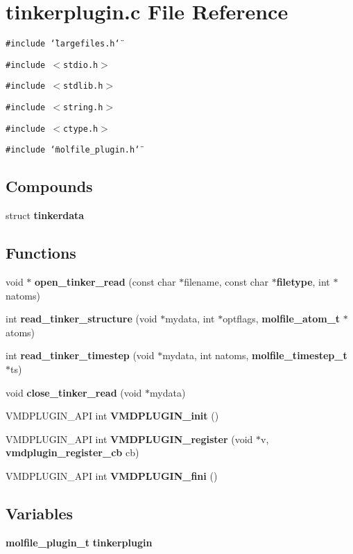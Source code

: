 \section{tinkerplugin.c File Reference}
\label{tinkerplugin_8c}
{\tt \#include \char`\"{}largefiles.h\char`\"{}}\par
{\tt \#include $<$stdio.h$>$}\par
{\tt \#include $<$stdlib.h$>$}\par
{\tt \#include $<$string.h$>$}\par
{\tt \#include $<$ctype.h$>$}\par
{\tt \#include \char`\"{}molfile\_\-plugin.h\char`\"{}}\par
\subsection*{Compounds}
\begin{CompactItemize}
\item 
struct {\bf tinkerdata}
\end{CompactItemize}
\subsection*{Functions}
\begin{CompactItemize}
\item 
void $\ast$ {\bf open\_\-tinker\_\-read} (const char $\ast$filename, const char $\ast${\bf filetype}, int $\ast$natoms)
\item 
int {\bf read\_\-tinker\_\-structure} (void $\ast$mydata, int $\ast$optflags, {\bf molfile\_\-atom\_\-t} $\ast$atoms)
\item 
int {\bf read\_\-tinker\_\-timestep} (void $\ast$mydata, int natoms, {\bf molfile\_\-timestep\_\-t} $\ast$ts)
\item 
void {\bf close\_\-tinker\_\-read} (void $\ast$mydata)
\item 
VMDPLUGIN\_\-API int {\bf VMDPLUGIN\_\-init} ()
\item 
VMDPLUGIN\_\-API int {\bf VMDPLUGIN\_\-register} (void $\ast$v, {\bf vmdplugin\_\-register\_\-cb} cb)
\item 
VMDPLUGIN\_\-API int {\bf VMDPLUGIN\_\-fini} ()
\end{CompactItemize}
\subsection*{Variables}
\begin{CompactItemize}
\item 
{\bf molfile\_\-plugin\_\-t} {\bf tinkerplugin}
\end{CompactItemize}


